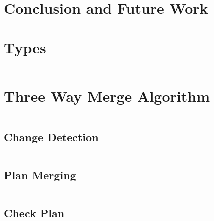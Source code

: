 \documentclass[a4paper,english]{ifimaster}
\begin{document}
\chapter{Conclusion and Future Work}%
\label{cha:conclusion_and_future_work}

\backmatter{}

\begin{appendices}

\chapter{Types}%
\label{cha:types_appendix}

\inputminted[linenos, breaklines]{haskell}{../../backend/src/Types.hs}

\chapter{Three Way Merge Algorithm}%
\label{cha:three_way_merge_appendix}

\inputminted[linenos, breaklines]{haskell}{../../backend/src/ThreeWayMerge.hs}

\section{Change Detection}%
\label{sec:change_detection_appendix}

\inputminted[linenos, breaklines]{haskell}{../../backend/src/Merge/ChangeDetection.hs}

\section{Plan Merging}%
\label{sec:plan_merging_appendix}

\inputminted[linenos, breaklines]{haskell}{../../backend/src/Merge/PlanMerging.hs}

\section{Check Plan}%
\label{sec:check_plan_appendix}

\inputminted[linenos, breaklines]{haskell}{../../backend/src/Merge/CheckPlan.hs}

\end{appendices}

\printbibliography
\end{document}
